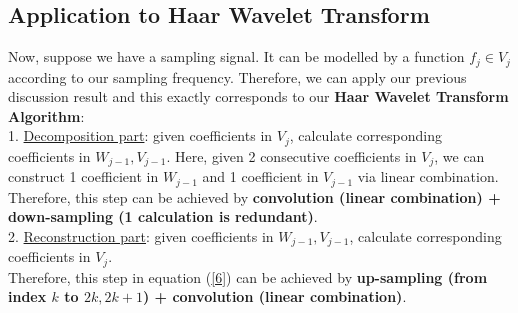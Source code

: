 \documentclass{article}
\begin{document}
\subsection{Application to Haar Wavelet Transform}
Now, suppose we have a sampling signal. It can be modelled by a function $f_j \in V_j$ according to our sampling frequency. Therefore, we can apply our previous discussion result and this exactly corresponds to our \textbf{Haar Wavelet Transform Algorithm}:
\vspace{4pt}
\\
1. \underline{Decomposition part}: given coefficients in $V_j$, calculate corresponding coefficients in $W_{j-1}, V_{j-1}$. Here, given 2 consecutive coefficients in $V_j$, we can construct 1 coefficient in $W_{j-1}$ and 1 coefficient in $V_{j-1}$ via linear combination.
\\
Therefore, this step can be achieved by \textbf{convolution (linear combination) + down-sampling (1 calculation is redundant)}.
\vspace{4pt}
\\
2. \underline{Reconstruction part}: given coefficients in $W_{j-1}, V_{j-1}$, calculate corresponding coefficients in $V_{j}$. 
\\
Therefore, this step in equation (\ref{6}) can be achieved by \textbf{up-sampling (from index $k$ to $2k, 2k+1$) + convolution (linear combination)}.
\end{document}
